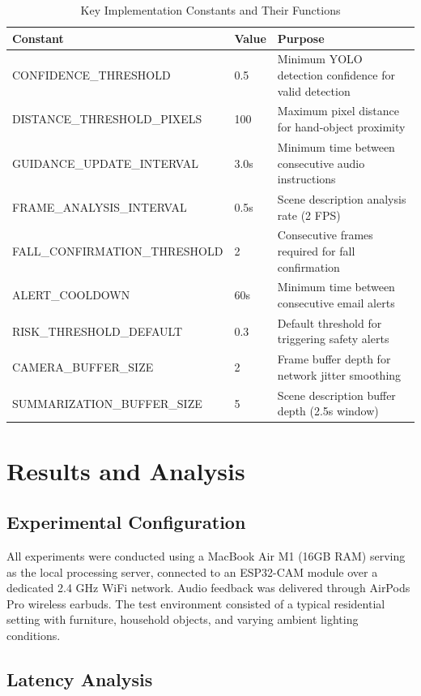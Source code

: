 \documentclass[12pt,a4paper]{report}
\begin{document}
\begin{table}[H]
\centering
\caption{Key Implementation Constants and Their Functions}
\label{tab:impl_constants}
\begin{tabular}{@{}llp{}@{}}
\toprule
\textbf{Constant} & \textbf{Value} & \textbf{Purpose} \\ \midrule
CONFIDENCE\_THRESHOLD & 0.5 & Minimum YOLO detection confidence for valid detection \\
DISTANCE\_THRESHOLD\_PIXELS & 100 & Maximum pixel distance for hand-object proximity \\
GUIDANCE\_UPDATE\_INTERVAL & 3.0s & Minimum time between consecutive audio instructions \\
FRAME\_ANALYSIS\_INTERVAL & 0.5s & Scene description analysis rate (2 FPS) \\
FALL\_CONFIRMATION\_THRESHOLD & 2 & Consecutive frames required for fall confirmation \\
ALERT\_COOLDOWN & 60s & Minimum time between consecutive email alerts \\
RISK\_THRESHOLD\_DEFAULT & 0.3 & Default threshold for triggering safety alerts \\
CAMERA\_BUFFER\_SIZE & 2 & Frame buffer depth for network jitter smoothing \\
SUMMARIZATION\_BUFFER\_SIZE & 5 & Scene description buffer depth (2.5s window) \\ \bottomrule
\end{tabular}
\end{table}

\chapter{Results and Analysis}

\section{Experimental Configuration}

All experiments were conducted using a MacBook Air M1 (16GB RAM) serving as the local processing server, connected to an ESP32-CAM module over a dedicated 2.4 GHz WiFi network. Audio feedback was delivered through AirPods Pro wireless earbuds. The test environment consisted of a typical residential setting with furniture, household objects, and varying ambient lighting conditions.

\section{Latency Analysis}
\end{document}
